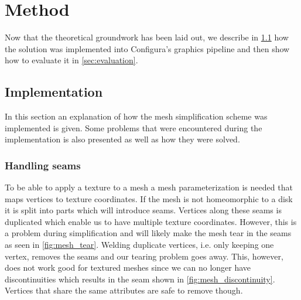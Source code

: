 

\chapter{Method} \label{cha:method}
  Now that the theoretical groundwork has been laid out, we describe in \cref{sec:implementation} how the solution was implemented into Configura's graphics pipeline and then show how to evaluate it in \cref{sec:evaluation}.
  

\section{Implementation} \label{sec:implementation}
In this section an explanation of how the mesh simplification scheme was implemented is given. Some problems that were encountered during the implementation is also presented as well as how they were solved.

\subsection{Handling seams}
To be able to apply a texture to a mesh a mesh parameterization is needed that maps vertices to texture coordinates. If the mesh is not homeomorphic to a disk it is split into parts which will introduce seams. Vertices along these seams is duplicated which enable us to have multiple texture coordinates. However, this is a problem during simplification and will likely make the mesh tear in the seams as seen in \cref{fig:mesh_tear}. Welding duplicate vertices, i.e. only keeping one vertex, removes the seams and our tearing problem goes away. This, however, does not work good for textured meshes since we can no longer have discontinuities which results in the seam shown in \cref{fig:mesh_discontinuity}. Vertices that share the same attributes are safe to remove though.

